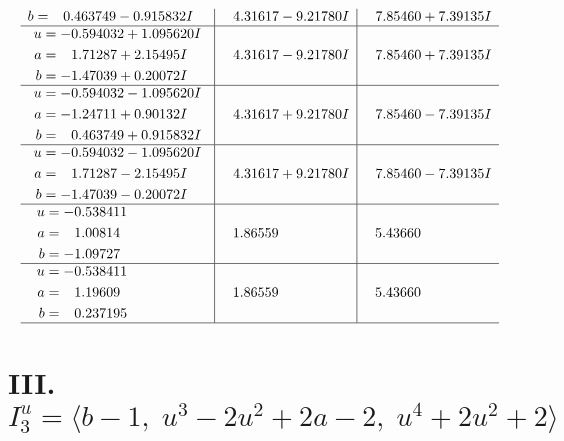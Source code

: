 \documentclass[1p]{elsarticle_modified}
\theoremstyle{definition}
\begin{document}
$$\begin{array}{c|c|c}
\begin{aligned}
b &= \phantom{-}0.463749 - 0.915832 I\end{aligned}
 & \phantom{-}4.31617 - 9.21780 I & \phantom{-}7.85460 + 7.39135 I \\ \hline\begin{aligned}
u &= -0.594032 + 1.095620 I \\
a &= \phantom{-}1.71287 + 2.15495 I \\
b &= -1.47039 + 0.20072 I\end{aligned}
 & \phantom{-}4.31617 - 9.21780 I & \phantom{-}7.85460 + 7.39135 I \\ \hline\begin{aligned}
u &= -0.594032 - 1.095620 I \\
a &= -1.24711 + 0.90132 I \\
b &= \phantom{-}0.463749 + 0.915832 I\end{aligned}
 & \phantom{-}4.31617 + 9.21780 I & \phantom{-}7.85460 - 7.39135 I \\ \hline\begin{aligned}
u &= -0.594032 - 1.095620 I \\
a &= \phantom{-}1.71287 - 2.15495 I \\
b &= -1.47039 - 0.20072 I\end{aligned}
 & \phantom{-}4.31617 + 9.21780 I & \phantom{-}7.85460 - 7.39135 I \\ \hline\begin{aligned}
u &= -0.538411\phantom{ +0.000000I} \\
a &= \phantom{-}1.00814\phantom{ +0.000000I} \\
b &= -1.09727\phantom{ +0.000000I}\end{aligned}
 & \phantom{-}1.86559\phantom{ +0.000000I} & \phantom{-}5.43660\phantom{ +0.000000I} \\ \hline\begin{aligned}
u &= -0.538411\phantom{ +0.000000I} \\
a &= \phantom{-}1.19609\phantom{ +0.000000I} \\
b &= \phantom{-}0.237195\phantom{ +0.000000I}\end{aligned}
 & \phantom{-}1.86559\phantom{ +0.000000I} & \phantom{-}5.43660\phantom{ +0.000000I}\\
 \hline 
 \end{array}$$\newpage\newpage\renewcommand{\arraystretch}{1}
\centering \section*{III. $I^u_{3}= \langle b-1,\;u^3-2 u^2+2 a-2,\;u^4+2 u^2+2 \rangle$}
\end{document}
